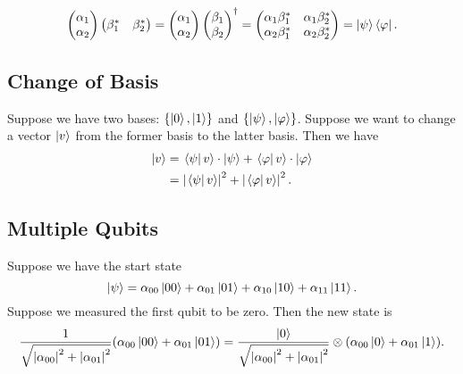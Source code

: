 \documentclass[class=article, crop=false]{standalone}
\begin{document}
  \[
    \begin{pmatrix}
      \alpha_1 \\
      \alpha_2
    \end{pmatrix} \begin{pmatrix}
      \beta_1^* & \beta_2^*
    \end{pmatrix} = \begin{pmatrix}
      \alpha_1 \\
      \alpha_2
    \end{pmatrix} \begin{pmatrix}
      \beta_1 \\
      \beta_2
    \end{pmatrix}^\dagger = \begin{pmatrix}
      \alpha_1\beta_1^* & \alpha_1\beta_2^* \\
      \alpha_2\beta_1^* & \alpha_2\beta_2^*
    \end{pmatrix} = \left\lvert \psi \right\rangle\left\langle \varphi \right\rvert.
  \]
  \subsection{Change of Basis}
  Suppose we have two bases: $\left\{\left\lvert 0 \right\rangle, \left\lvert 1 \right\rangle\right\}$ and $\left\{\left\lvert \psi \right\rangle, \left\lvert \varphi \right\rangle\right\}$. Suppose we want to change a vector $\left\lvert v \right\rangle$ from the former basis to the latter basis. Then we have
  \begin{align*}
    \left\lvert v \right\rangle &= \left.\left\langle \psi\right\vert v \right\rangle\cdot \left\lvert \psi \right\rangle + \left.\left\langle \varphi\right\vert v \right\rangle\cdot \left\lvert \varphi \right\rangle \\
            &= \left\lvert \left.\left\langle \psi\right\vert v \right\rangle \right\rvert^2 + \left\lvert \left.\left\langle \varphi\right\vert v \right\rangle \right\rvert^2.
  \end{align*}
  \subsection{Multiple Qubits}
  Suppose we have the start state
  \[
    \left\lvert \psi \right\rangle = \alpha_{00}\left\lvert 00 \right\rangle + \alpha_{01}\left\lvert 01 \right\rangle + \alpha_{10}\left\lvert 10 \right\rangle + \alpha_{11}\left\lvert 11 \right\rangle.
  \]
  Suppose we measured the first qubit to be zero. Then the new state is
  \[
    \frac{1}{\sqrt{\left\lvert \alpha_{00} \right\rvert^2 + \left\lvert \alpha_{01} \right\rvert^2}}(\alpha_{00}\left\lvert 00 \right\rangle + \alpha_{01}\left\lvert 01 \right\rangle) = \frac{\left\lvert 0 \right\rangle}{\sqrt{\left\lvert \alpha_{00} \right\rvert^2 + \left\lvert \alpha_{01} \right\rvert^2}}\otimes (\alpha_{00}\left\lvert 0 \right\rangle + \alpha_{01}\left\lvert 1 \right\rangle).
  \]
\end{document}

